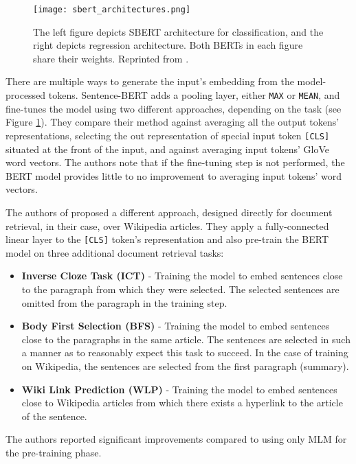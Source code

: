 \begin{figure}[!htb]
        \centering
        \texttt{[image: sbert\_architectures.png]}
        \caption[SBERT Architectures]{The left figure depicts SBERT architecture for classification, and the right depicts regression architecture. Both BERTs in each figure share their weights. Reprinted from \citep{sbert}.}
        \label{fig:sbert_architectures}
\end{figure}

There are multiple ways to generate the input's embedding from the model-processed tokens.
Sentence-BERT \citep{sbert} adds a pooling layer, either \texttt{MAX} or \texttt{MEAN}, and fine-tunes the model using two different approaches, depending on the task (see Figure \ref{fig:sbert_architectures}).
They compare their method against averaging all the output tokens' representations, selecting the out representation of special input token \texttt{[CLS]} situated at the front of the input, and against averaging input tokens' GloVe \citep{glove} word vectors.
The authors note that if the fine-tuning step is not performed, the BERT model provides little to no improvement to averaging input tokens' word vectors.

The authors of \citep{two-tower} proposed a different approach, designed directly for document retrieval, in their case, over Wikipedia articles. 
They apply a fully-connected linear layer to the \texttt{[CLS]} token's representation and also pre-train the BERT model on three additional document retrieval tasks:
\begin{itemize}
        \item \textbf{Inverse Cloze Task (ICT)} - Training the model to embed sentences close to the paragraph from which they were selected. The selected sentences are omitted from the paragraph in the training step.
        \item \textbf{Body First Selection (BFS)} - Training the model to embed sentences close to the paragraphs in the same article. The sentences are selected in such a manner as to reasonably expect this task to succeed. In the case of training on Wikipedia, the sentences are selected from the first paragraph (summary).
        \item \textbf{Wiki Link Prediction (WLP)} - Training the model to embed sentences close to Wikipedia articles from which there exists a hyperlink to the article of the sentence.
\end{itemize}
The authors reported significant improvements compared to using only MLM for the pre-training phase.

